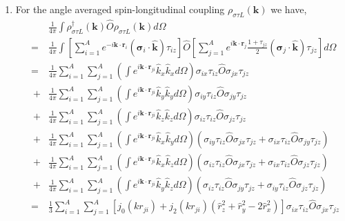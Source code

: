 \documentclass[12pt,letterpaper,UTF8]{report}
\begin{document}
{\begin{enumerate}
\begin{eqnarray}
&=&
 \sum_{i=1}^{A} \sum_{j=1}^{A} j_0(k{r}_{ji})
\tau_{iz} \hat{O}\tau_{jz} .
\end{eqnarray}
  \item For the angle averaged spin-longitudinal coupling $\rho_{\sigma \tau L} (\bm{k})$ we have,
\begin{eqnarray}
&&
\frac{1}{4\pi} \int \rho_{\sigma \tau L}^\dagger(\bm{k}) \hat{O} \rho_{\sigma \tau L}(\bm{k})  d \Omega \nonumber \\
&=&
\frac{1}{4\pi} \int  \left[\sum_{i=1}^{A} e^{-i \bm{k} \cdot \bm{r}_i } (\bm{\sigma}_i \cdot \hat{\bm{k}}) \tau_{iz}  \right]
\hat{O}
\left[\sum_{j=1}^{A} e^{i \bm{k} \cdot \bm{r}_j } \frac{1+\tau_{jz}}{2} (\bm{\sigma}_j \cdot \hat{\bm{k}}) \tau_{jz}  \right]  d \Omega  \nonumber \\
&=&
\frac{1}{4\pi}
\sum_{i=1}^{A} \sum_{j=1}^{A} \left( \int e^{i \bm{k} \cdot \bm{r}_{ji} } \hat{k}_x \hat{k}_x d \Omega \right)
\sigma_{ix} \tau_{iz} \hat{O} \sigma_{jx} \tau_{jz} \nonumber \\
&~+& \frac{1}{4\pi} \sum_{i=1}^{A} \sum_{j=1}^{A} \left( \int e^{i \bm{k} \cdot \bm{r}_{ji} } \hat{k}_y \hat{k}_y d \Omega \right)
\sigma_{iy} \tau_{iz} \hat{O} \sigma_{jy} \tau_{jz} \nonumber \\
&~+& \frac{1}{4\pi} \sum_{i=1}^{A} \sum_{j=1}^{A} \left( \int e^{i \bm{k} \cdot \bm{r}_{ji} } \hat{k}_z \hat{k}_z d \Omega \right)
\sigma_{iz} \tau_{iz} \hat{O} \sigma_{jz} \tau_{jz} \nonumber \\
&~+& \frac{1}{4\pi} \sum_{i=1}^{A} \sum_{j=1}^{A} \left( \int e^{i \bm{k} \cdot \bm{r}_{ji} } \hat{k}_x \hat{k}_y d \Omega \right)
\left(\sigma_{iy} \tau_{iz} \hat{O} \sigma_{jx} \tau_{jz} + \sigma_{ix} \tau_{iz} \hat{O} \sigma_{jy} \tau_{jz}  \right)\nonumber \\
&~+& \frac{1}{4\pi} \sum_{i=1}^{A} \sum_{j=1}^{A} \left( \int e^{i \bm{k} \cdot \bm{r}_{ji} } \hat{k}_x \hat{k}_z d \Omega \right)
\left(\sigma_{iz} \tau_{iz} \hat{O} \sigma_{jx} \tau_{jz} + \sigma_{ix} \tau_{iz} \hat{O} \sigma_{jz} \tau_{jz} \right) \nonumber \\
&~+& \frac{1}{4\pi} \sum_{i=1}^{A} \sum_{j=1}^{A} \left( \int e^{i \bm{k} \cdot \bm{r}_{ji} } \hat{k}_y \hat{k}_z d \Omega \right)
\left( \sigma_{iz} \tau_{iz} \hat{O} \sigma_{jy} \tau_{jz} + \sigma_{iy} \tau_{iz} \hat{O} \sigma_{jz} \tau_{jz} \right) \nonumber \\
&=&
\frac{1}{3} \sum_{i=1}^{A} \sum_{j=1}^{A}
\left[
j_0(k{r}_{ji})+j_2(k{r}_{ji})(\hat{r}_z^2+\hat{r}_y^2-2\hat{r}_x^2)
\right]
\sigma_{ix} \tau_{iz} \hat{O} \sigma_{jx} \tau_{jz} \nonumber \\

\end{eqnarray}
\end{enumerate}}
\end{document}
